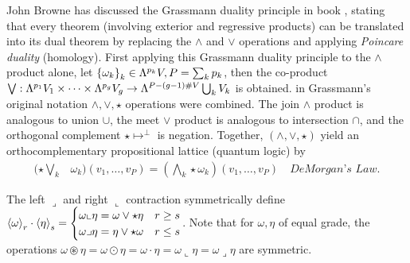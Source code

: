 \documentclass{juliacon}
\begin{document}
John Browne has discussed the Grassmann duality principle in book \cite{browne}, stating that every theorem (involving exterior and regressive products) can be translated into its dual theorem by replacing the $\wedge$ and $\vee$ operations and applying \textit{Poincare duality} (homology).
First applying this Grassmann duality principle to the $\wedge$ product alone, let $\left\{ \omega_k \right\}_k\in\Lambda^{p_k}V, P=\sum_kp_k$, then the co-product
$\bigvee :\Lambda^{p_1}V_1\times\dots\times\Lambda^{p_g}V_g \rightarrow \Lambda^{P-(g-1)\#V}\bigcup_k V_k$ is obtained.
in Grassmann's original notation $\wedge,\vee,\star$ operations were combined.
The join $\wedge$ product is analogous to union $\cup$, the meet $\vee$ product is analogous to intersection $\cap$, and the orthogonal complement $\star\mapsto^\perp$ is negation.
Together, $(\wedge,\vee,\star)$ yield an orthocomplementary propositional lattice (quantum logic) by
\begin{align*}
	(\star\bigvee_k &\omega_k)(v_1,\dots,v_P) = (\bigwedge_k\star\omega_k)(v_1,\dots,v_P) \quad \textit{DeMorgan's Law}.
\end{align*}
\begin{definition}
	The left $\lrcorner$ and right $\llcorner$ contraction symmetrically define
	$ \left\langle \omega \right\rangle_r\cdot\left\langle \eta \right\rangle_s = \begin{cases} \omega\llcorner\eta=\omega\vee\star\eta & r\geq s \\ \omega\lrcorner\eta=\eta\vee\star\omega & r\leq s \end{cases} $.
	Note that for $\omega,\eta$ of equal grade, the operations $\omega\circledast\eta = \omega\odot\eta = \omega\cdot\eta = \omega\llcorner\eta = \omega\lrcorner\eta$ are symmetric.
\end{definition}
\end{document}

